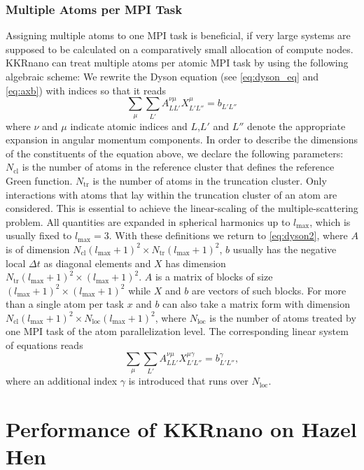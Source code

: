 \documentclass[graybox]{svmult}
\newcommand{\beq}{\begin{equation}}
\newcommand{\eeq}{\end{equation}}
\begin{document}
\subsubsection*{Multiple Atoms per MPI Task}

Assigning multiple atoms to one MPI task is beneficial, if very large systems are
supposed to be calculated on a comparatively small allocation of compute nodes.
KKRnano can treat multiple atoms per atomic MPI task by using the following algebraic scheme: 
We rewrite the Dyson equation (see \cref{eq:dyson_eq} and \cref{eq:axb}) with indices so that it reads
\beq
\sum_{\mu} \sum_{L'} A^{\nu \mu}_{LL'} X^{\mu}_{L'L''} = b_{L'L''}
\label{eq:dyson2}
\eeq
where $\nu$ and $\mu$ indicate atomic indices and $L$,$L'$ and $L''$ denote
the appropriate expansion in angular momentum components.
In order to describe the dimensions of the constituents of the equation above, we
declare the following parameters:
$N_{\text{cl}}$ is the number of atoms in the reference cluster that defines the reference Green function.
$N_{\text{tr}}$ is the number of atoms in the truncation cluster. Only interactions with atoms that lay 
within the truncation cluster of an atom are considered. This is essential to achieve
the linear-scaling of the multiple-scattering problem. 
All quantities are expanded in spherical harmonics up to $l_{\text{max}}$, which is usually fixed to
$l_{\text{max}}=3$.
With these definitions we return to \cref{eq:dyson2}, where $A$ is of dimension 
$N_{\text{cl}} (l_{\text{max}}+1)^2 \times N_{\text{tr}} (l_{\text{max}}+1)^2$,
$b$ usually has the
negative local $\Delta t$ as diagonal elements
and $X$ has dimension $N_{\text{tr}} (l_{\text{max}}+1)^2 \times (l_{\text{max}}+1)^2$.
$A$ is a matrix of blocks of size ${(l_{\text{max}}+1)}^2 \times {(l_{\text{max}}+1)}^2$
while $X$ and $b$ are vectors
of such blocks. For more than a single atom per task $x$ and $b$ can also take a matrix form
with dimension $N_{\text{cl}} (l_{\text{max}}+1)^2 \times N_{\text{loc}} (l_{\text{max}}+1)^2$, where
$N_{\text{loc}}$ is the number of atoms treated by one MPI task of the atom parallelization level.
The corresponding linear system of equations reads
\beq
\label{eq:dyson_equation_lap_multi}
\sum_{\mu} \sum_{L'} A^{\nu \mu}_{LL'} X^{\mu \gamma}_{L'L''} = b^{\gamma}_{L'L''},
\eeq
where an additional index $\gamma$ is introduced that runs over $N_{\text{loc}}$. 


\section{Performance of KKRnano on Hazel Hen}
\label{sec:performance}
\end{document}
